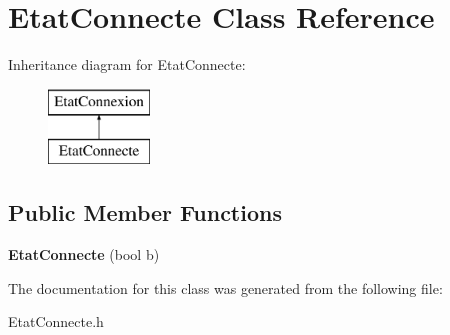 \section{Etat\-Connecte Class Reference}
\label{class_etat_connecte}
Inheritance diagram for Etat\-Connecte\-:\begin{figure}[H]
\begin{center}
\leavevmode
\includegraphics[height=2.000000cm]{class_etat_connecte}
\end{center}
\end{figure}
\subsection*{Public Member Functions}
\begin{DoxyCompactItemize}
\item 
{\bfseries Etat\-Connecte} (bool b)\label{class_etat_connecte_ab6bab0d2f0717b3803f75efe27e1915a}

\end{DoxyCompactItemize}


The documentation for this class was generated from the following file\-:\begin{DoxyCompactItemize}
\item 
Etat\-Connecte.\-h\end{DoxyCompactItemize}

